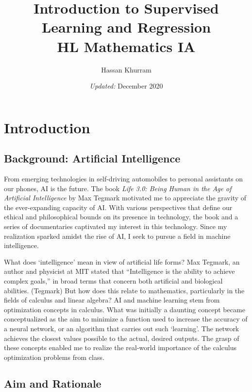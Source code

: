 \documentclass[12pt,a4paper]{article}
\title{Introduction to Supervised Learning and Regression \\
 \large HL Mathematics IA}
\author{Hassan Khurram}
\date{\textit{Updated:} December 2020}
\begin{document}
\maketitle

  
\tableofcontents

\newpage

\section{Introduction}

\subsection{Background: Artificial Intelligence}

From emerging technologies in self-driving automobiles to personal assistants on our phones, AI is the future. The book \textit{Life 3.0: Being Human in the Age of Artificial Intelligence} by Max Tegmark motivated me to appreciate the gravity of the ever-expanding capacity of AI. With various perspectives that define our ethical and philosophical bounds on its presence in technology, the book and a series of documentaries captivated my interest in this technology. Since my realization sparked amidst the rise of AI, I seek to pursue a field in machine intelligence.

What does ‘intelligence’ mean in view of artificial life forms? Max Tegmark, an author and physicist at MIT stated that “Intelligence is the ability to achieve complex goals,” in broad terms that concern both artificial and biological abilities. (Tegmark) But how does this relate to mathematics, particularly in the fields of calculus and linear algebra? AI and machine learning stem from optimization concepts in calculus. What was initially a daunting concept became conceptualized as the aim to minimize a function used to increase the accuracy of a neural network, or an algorithm that carries out such ‘learning’. The network achieves the closest values possible to the actual, desired outputs. The grasp of these concepts enabled me to realize the real-world importance of the calculus optimization problems from class.

\subsection{Aim and Rationale}
\end{document}
